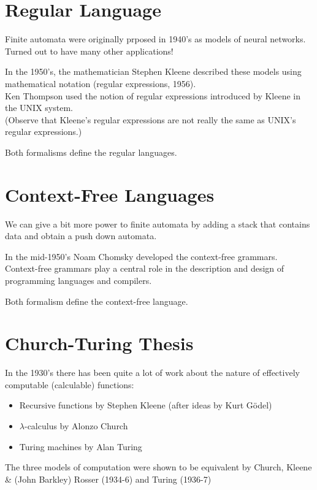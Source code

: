 \section{Regular Language}
\label{sec:Regular Language}
Finite automata were originally prposed in 1940's as models of neural networks.\\
Turned out to have many other applications!\\
\smallskip

\noindent
In the 1950's, the mathematician Stephen Kleene described these models
using mathematical notation (regular expressions, 1956).\\
Ken Thompson used the notion of regular expressions introduced by Kleene
in the UNIX system.\\
(Observe that Kleene's regular expressions are not really the same as UNIX's
regular expressions.)\\
\smallskip

\noindent
Both formalisms define the regular languages.

\section{Context-Free Languages}
\label{sec:Context-Free Languages}
We can give a bit more power to finite automata by adding a stack that
contains data and obtain a {\color{red} push down automata}.\\
\smallskip

\noindent
In the mid-1950's Noam Chomsky developed the {\color{red} context-free grammars.}\\
Context-free grammars play a central role in the description and design
of programming languages and compilers.\\
\smallskip

\noindent
Both formalism define the {\color{red} context-free language}.

\section{Church-Turing Thesis}
\label{sec:Church-Turing Thesis}
In the 1930's there has been quite a lot of work about the nature of
effectively computable (calculable) functions:
\begin{itemize}
	\item Recursive functions by Stephen Kleene (after ideas by Kurt Gödel)
	\item $\lambda$-calculus by Alonzo Church
	\item Turing machines by Alan Turing
\end{itemize}
The three models of computation were shown to be equivalent by Church, Kleene \&
(John Barkley) Rosser (1934-6) and Turing (1936-7)\\
\smallskip

